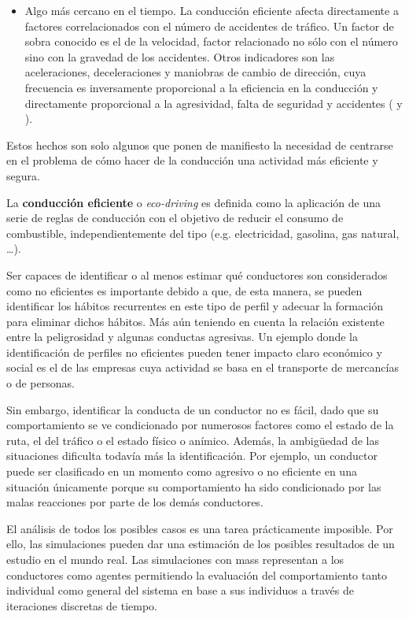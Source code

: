 \begin{itemize}
	\item Algo más cercano en el tiempo. La conducción eficiente afecta directamente a factores correlacionados con el número de accidentes de tráfico. Un factor de sobra conocido es el de la velocidad, factor relacionado no sólo con el número sino con la gravedad de los accidentes\cite{imprialou2016re}. Otros indicadores son las aceleraciones, deceleraciones y maniobras de cambio de dirección, cuya frecuencia es inversamente proporcional a la eficiencia en la conducción y directamente proporcional a la agresividad, falta de seguridad y accidentes (\cite{dingus2006100} y \cite{lerner2010exploration}).
\end{itemize}

Estos hechos son solo algunos que ponen de manifiesto la necesidad de centrarse en el problema de cómo hacer de la conducción una actividad más eficiente y segura.

La \textbf{conducción eficiente} o \textit{eco-driving} es definida como la aplicación de una serie de reglas de conducción con el objetivo de reducir el consumo de combustible, independientemente del tipo (e.g. electricidad, gasolina, gas natural, \ldots).

Ser capaces de identificar o al menos estimar qué conductores son considerados como no eficientes es importante debido a que, de esta manera, se pueden identificar los hábitos recurrentes en este tipo de perfil y adecuar la formación para eliminar dichos hábitos. Más aún teniendo en cuenta la relación existente entre la peligrosidad y algunas conductas agresivas. Un ejemplo donde la identificación de perfiles no eficientes pueden tener impacto claro económico y social es el de las empresas cuya actividad se basa en el transporte de mercancías o de personas.

Sin embargo, identificar la conducta de un conductor no es fácil, dado que su comportamiento se ve condicionado por numerosos factores como el estado de la ruta, el del tráfico o el estado físico o anímico. Además, la ambigüedad de las situaciones dificulta todavía más la identificación. Por ejemplo, un conductor puede ser clasificado en un momento como agresivo o no eficiente en una situación únicamente porque su comportamiento ha sido condicionado por las malas reacciones por parte de los demás conductores.

El análisis de todos los posibles casos es una tarea prácticamente imposible. Por ello, las simulaciones pueden dar una estimación de los posibles resultados de un estudio en el mundo real. Las simulaciones con \acp{mas} representan a los conductores como agentes permitiendo la evaluación del comportamiento tanto individual como general del sistema en base a sus individuos a través de iteraciones discretas de tiempo.

